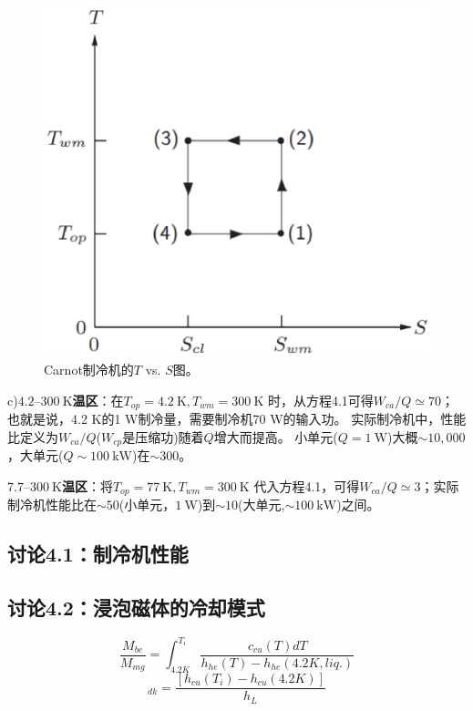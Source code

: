\begin{figure}[htbp]
	\centering
	\includegraphics[scale=0.5]{chpt4/figs/fig4.4.eps}
	\caption{Carnot制冷机的$T$ vs. $S$图。}
\end{figure}

c)\textbf{$4.2–300\ \mathrm{K}$温区}：在$T_{op} = 4.2\ \mathrm{K}, T_{wm} = 300\ \mathrm{K}$
时，从方程4.1可得$W_{ca}/Q\simeq 70$；也就是说，4.2 K的1 W制冷量，需要制冷机70 W的输入功。
实际制冷机中，性能比定义为$W_{ca}/Q$($W_{cp}$是压缩功)随着$Q$增大而提高。
小单元($Q=1\ \mathrm{W}$)大概$\sim 10,000$，大单元($Q\sim 100\ \mathrm{kW}$)在$\sim 300$。

\textbf{$7.7–300\ \mathrm{K}$温区}：将$T_{op} = 77\ \mathrm{K}, T_{wm} = 300\ \mathrm{K}$
代入方程4.1，可得$W_{ca}/Q\simeq 3$；实际制冷机性能比在$\sim 50$(小单元，$1\ \mathrm{W}$)到$\sim 10$(大单元,$\sim 100\ \mathrm{kW}$)之间。

\subsection{讨论4.1：制冷机性能}


\subsection{讨论4.2：浸泡磁体的冷却模式}
\begin{equation}%
\frac{M_{be}}{M_{mg}}=\int_{4.2K}^{T_i}\frac{c_{cu}(T)dT}{h_{he}(T)-h_{he}(4.2K,liq.)}
\end{equation}
\begin{equation}%
[\frac{M_{be}}{M_{mg}}]_{dk}=\frac{[h_{cu}(T_i)-h_{cu}(4.2K)]}{h_L}
\end{equation}



